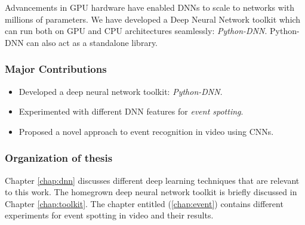 Advancements in GPU hardware have enabled DNNs to scale to networks with millions of parameters.  We have developed a Deep Neural Network toolkit which can run both on GPU and CPU architectures seamlessly: \textit{Python-DNN}.  Python-DNN can also act as a standalone library.

\subsubsection{Major Contributions}
\begin{itemize}
\item Developed a deep neural network toolkit: \textit{Python-DNN}. 
\item Experimented with different DNN features for \textit{event spotting}.
\item Proposed a novel approach to event recognition in video using CNNs.
\end{itemize}

\subsubsection{Organization of thesis}
Chapter \ref{chap:dnn} discusses different deep learning techniques that are relevant to this work.  The homegrown deep neural network toolkit is briefly discussed in Chapter \ref{chap:toolkit}.  The chapter entitled  (\ref{chap:event}) contains different experiments for event spotting in video and their results.
